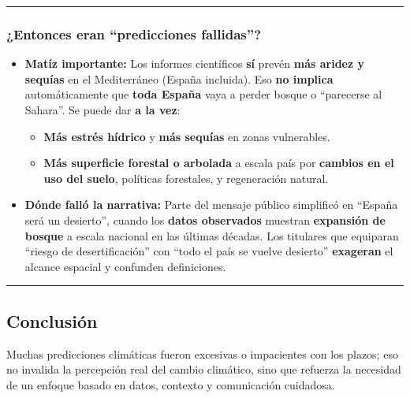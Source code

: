 \documentclass[
  10pt,
  a4paper,
  DIV=11,
  numbers=noendperiod,
  open=any]{scrreprt}
\providecommand{\tightlist}{%
  \setlength{\itemsep}{0pt}\setlength{\parskip}{0pt}}
\numberwithin{equation}{chapter}
\numberwithin{equation}{chapter}
\renewcommand{\[}{\begin{equation}}
\renewcommand{\]}{\end{equation}}
\begin{document}
\begin{center}\rule{0.5\linewidth}{0.5pt}\end{center}

\subsubsection{¿Entonces eran ``predicciones
fallidas''?}\label{entonces-eran-predicciones-fallidas}

\begin{itemize}
\tightlist
\item
  \textbf{Matíz importante:} Los informes científicos \textbf{sí} prevén
  \textbf{más aridez y sequías} en el Mediterráneo (España incluida).
  Eso \textbf{no implica} automáticamente que \textbf{toda España} vaya
  a perder bosque o ``parecerse al Sahara''. Se puede dar \textbf{a la
  vez}:

  \begin{itemize}
  \tightlist
  \item
    \textbf{Más estrés hídrico} y \textbf{más sequías} en zonas
    vulnerables.\\
  \item
    \textbf{Más superficie forestal o arbolada} a escala país por
    \textbf{cambios en el uso del suelo}, políticas forestales, y
    regeneración natural.
  \end{itemize}
\item
  \textbf{Dónde falló la narrativa:} Parte del mensaje público
  simplificó en ``España será un desierto'', cuando los \textbf{datos
  observados} muestran \textbf{expansión de bosque} a escala nacional en
  las últimas décadas. Los titulares que equiparan ``riesgo de
  desertificación'' con ``todo el país se vuelve desierto''
  \textbf{exageran} el alcance espacial y confunden definiciones.
\end{itemize}

\begin{center}\rule{0.5\linewidth}{0.5pt}\end{center}

\subsection{Conclusión}\label{conclusiuxf3n}

Muchas predicciones climáticas fueron excesivas o impacientes con los
plazos; eso no invalida la percepción real del cambio climático, sino
que refuerza la necesidad de un enfoque basado en datos, contexto y
comunicación cuidadosa.
\end{document}
